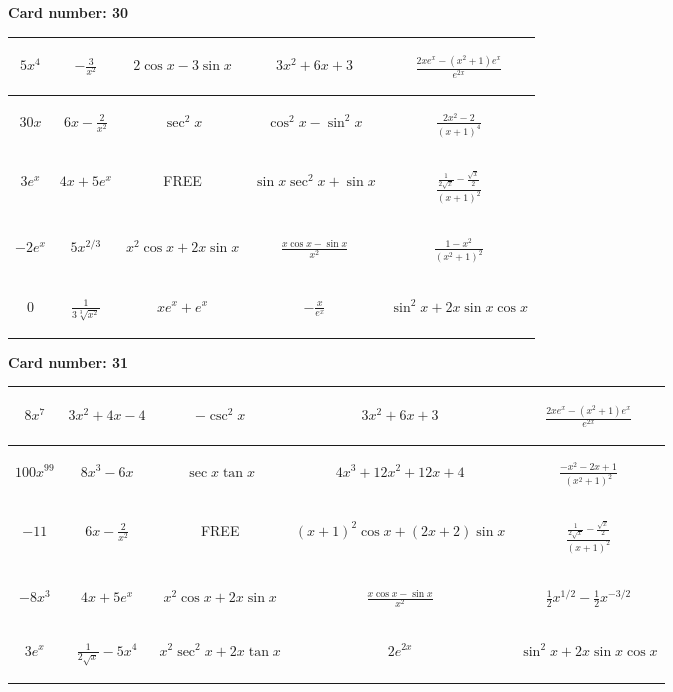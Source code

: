\documentclass{article}
\newcommand{\entry}[1]{\begin{minipage}[t][2.75cm][t]{4cm} \vspace{1cm} \begin{center}#1\end{center} \end{minipage}}
\newcommand{\freespace}{\entry{FREE}}
\newcommand{\cardnumber}[1]{\noindent \textbf{Card number: #1} \bigskip}
\begin{document}
\pagebreak

\cardnumber{30}
\begin{center}
\begin{tabular}{|*{5}{c|}}
    \hline
    \entry{$5x^4$} & \entry{$-\frac{3}{x^2}$} & \entry{$2 \cos x - 3 \sin x$} & \entry{$3x^2 + 6x + 3$} & \entry{$\frac{2x e^x - (x^2 + 1) e^x}{e^{2x}}$} \\ \hline
    \entry{$30x$} & \entry{$6x - \frac{2}{x^2}$} & \entry{$\sec^2 x$} & \entry{$\cos^2 x - \sin^2 x$} & \entry{$\frac{2x^2 - 2}{(x + 1)^4}$} \\ \hline
    \entry{$3e^x$} & \entry{$4x + 5e^x$} & \freespace & \entry{$\sin x \sec^2 x + \sin x$} & \entry{$\frac{\frac{1}{2 \sqrt{x}} - \frac{\sqrt{x}}{2}}{(x + 1)^2}$} \\ \hline
    \entry{$-2e^x$} & \entry{$5x^{2/3}$} & \entry{$x^2 \cos x + 2x \sin x$} & \entry{$\frac{x \cos x - \sin x}{x^2}$} & \entry{$\frac{1 - x^2}{(x^2 + 1)^2}$} \\ \hline
    \entry{$0$} & \entry{$\frac{1}{3\sqrt[3]{x^2}}$} & \entry{$x e^x + e^x$} & \entry{$-\frac{x}{e^x}$} & \entry{$\sin^2 x + 2x \sin x \cos x$} \\ \hline
\end{tabular}
\end{center}

\pagebreak

\cardnumber{31}
\begin{center}
\begin{tabular}{|*{5}{c|}}
    \hline
    \entry{$8x^7$} & \entry{$3x^2 + 4x - 4$} & \entry{$-\csc^2 x$} & \entry{$3x^2 + 6x + 3$} & \entry{$\frac{2x e^x - (x^2 + 1) e^x}{e^{2x}}$} \\ \hline
    \entry{$100x^{99}$} & \entry{$8x^3 - 6x$} & \entry{$\sec x \tan x$} & \entry{$4x^3 + 12x^2 + 12x + 4$} & \entry{$\frac{-x^2 - 2x + 1}{(x^2 + 1)^2}$} \\ \hline
    \entry{$-11$} & \entry{$6x - \frac{2}{x^2}$} & \freespace & \entry{$(x + 1)^2 \cos x + (2x + 2) \sin x$} & \entry{$\frac{\frac{1}{2 \sqrt{x}} - \frac{\sqrt{x}}{2}}{(x + 1)^2}$} \\ \hline
    \entry{$-8x^3$} & \entry{$4x + 5e^x$} & \entry{$x^2 \cos x + 2x \sin x$} & \entry{$\frac{x \cos x - \sin x}{x^2}$} & \entry{$\frac{1}{2} x^{1/2} - \frac{1}{2} x^{-3/2}$} \\ \hline
    \entry{$3e^x$} & \entry{$\frac{1}{2\sqrt{x}} - 5x^4$} & \entry{$x^2 \sec^2 x + 2x \tan x$} & \entry{$2e^{2x}$} & \entry{$\sin^2 x + 2x \sin x \cos x$} \\ \hline
\end{tabular}
\end{center}
\end{document}
